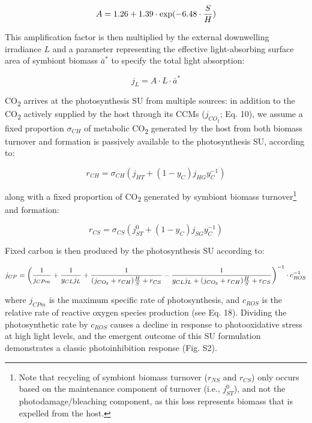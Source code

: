 \documentclass[]{elsarticle} %
\begin{document}
\begin{equation} A = 1.26 + 1.39 \cdot \exp(-6.48 \cdot {S \over H}) \end{equation}

This amplification factor is then multiplied by the external downwelling
irradiance \(L\) and a parameter representing the effective
light-absorbing surface area of symbiont biomass \(\bar{a}^*\) to
specify the total light absorption:

\begin{equation} j_L =  A \cdot L \cdot \bar{a}^* \end{equation}

CO\textsubscript{2} arrives at the photosynthesis SU from multiple
sources: in addition to the CO\textsubscript{2} actively supplied by the
host through its CCMs (\(j_{CO_2}\); Eq. 10), we assume a fixed
proportion \(\sigma_{CH}\) of metabolic CO\textsubscript{2} generated by
the host from both biomass turnover and formation is passively available
to the photosynthesis SU, according to:

\begin{equation} r_{CH}=\sigma_{CH}(j_{HT} + (1-y_C)j_{HG}y_C^{-1}) \end{equation}

along with a fixed proportion of CO\textsubscript{2} generated by
symbiont biomass turnover\footnote{Note that recycling of symbiont
  biomass turnover (\(r_{NS}\) and \(r_{CS}\)) only occurs based on the
  maintenance component of turnover (i.e., \(j_{ST}^0\)), and not the
  photodamage/bleaching component, as this loss represents biomass that
  is expelled from the host.} and formation:

\begin{equation} r_{CS}=\sigma_{CS}(j_{ST}^0 + (1-y_C)j_{SG}y_C^{-1}) \end{equation}

Fixed carbon is then produced by the photosynthesis SU according to:

\begin{equation} j_{CP} = \bigg({1 \over j_{CPm}} + {1 \over {y_{CL} j_L }} + {1 \over {(j_{CO_2} + r_{CH}){H \over S} + r_{CS}}} - {1 \over {y_{CL} j_L + (j_{CO_2} + r_{CH}){H \over S} + r_{CS}}}\bigg)^{-1} \cdot c_{ROS}^{-1} \end{equation}

where \(j_{CPm}\) is the maximum specific rate of photosynthesis, and
\(c_{ROS}\) is the relative rate of reactive oxygen species production
(see Eq. 18). Dividing the photosynthetic rate by \(c_{ROS}\) causes a
decline in response to photooxidative stress at high light levels, and
the emergent outcome of this SU formulation demonstrates a classic
photoinhibition response (Fig. S2).
\end{document}
